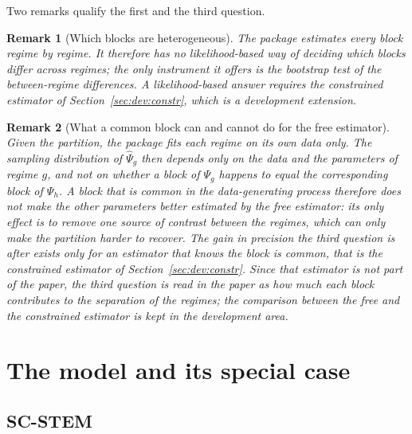 \documentclass[11pt]{article}
\newtheorem{remark}{Remark}
\begin{document}
Two remarks qualify the first and the third question.

\begin{remark}[Which blocks are heterogeneous]
The package estimates every block regime by regime. It therefore has no likelihood-based way of deciding \emph{which} blocks differ across regimes; the only instrument it offers is the bootstrap test of the between-regime differences. A likelihood-based answer requires the constrained estimator of Section~\ref{sec:dev:constr}, which is a development extension.
\end{remark}

\begin{remark}[What a common block can and cannot do for the free estimator]\label{rem:common}
Given the partition, the package fits each regime on its own data only. The sampling distribution of $\hat\Psi_g$ then depends only on the data and the parameters of regime $g$, and not on whether a block of $\Psi_g$ happens to equal the corresponding block of $\Psi_h$. A block that is common in the data-generating process therefore does \emph{not} make the other parameters better estimated by the free estimator: its only effect is to remove one source of contrast between the regimes, which can only make the partition harder to recover. The gain in precision the third question is after exists only for an estimator that \emph{knows} the block is common, that is the constrained estimator of Section~\ref{sec:dev:constr}. Since that estimator is not part of the paper, the third question is read in the paper as \emph{how much each block contributes to the separation of the regimes}; the comparison between the free and the constrained estimator is kept in the development area.
\end{remark}

\section{The model and its special case}\label{sec:model}

\subsection{SC-STEM}
\end{document}
